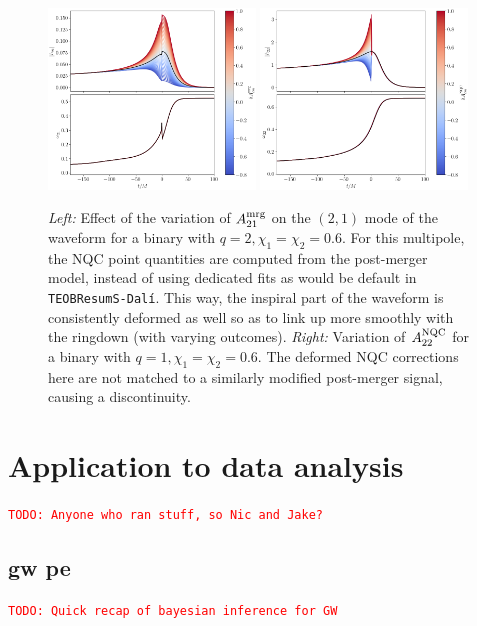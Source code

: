 \documentclass[prd,amssymb,amsmath,amsfonts,nofootinbib,reprint,showpacs,longbibliography]{revtex4-1}
\newcommand{\todo}[1]{\textcolor{red}{\texttt{TODO: #1}}}
\newcommand{\amrg}[1]{{A_{#1}^{\rm mrg}}}
\newcommand{\anqc}[1]{{A_{#1}^{\rm NQC}}}
\newcommand{\dali}[0]{\texttt{TEOBResumS-Dalí}}
\begin{document}
\begin{figure}
    \includegraphics[width=0.49\textwidth]{figs/delta_A21_mrg_-0.8_1.0.png}
    \includegraphics[width=0.49\textwidth]{figs/delta_A22_nqc_-0.8_1.0.png}
    \caption{\label{fig:bad_dev_mrgnqc}
    \textit{Left:} Effect of the variation of $\amrg{21}$ on the $(2,1)$ mode of the waveform
    for a binary with $q = 2, \chi_1 = \chi_2 = 0.6$.
    For this multipole, the NQC point quantities are computed from the post-merger model, instead of using
    dedicated fits as would be default in \dali. This way, the inspiral part of the waveform is
    consistently deformed as well so as to link up more smoothly with the ringdown (with varying outcomes).
    \textit{Right:} Variation of $\anqc{22}$ for a binary with $q = 1, \chi_1 = \chi_2 = 0.6$. The
    deformed NQC corrections here are not matched to a similarly modified post-merger signal, causing a discontinuity.}
\end{figure}

\section{Application to data analysis}
\todo{Anyone who ran stuff, so Nic and Jake? }

\subsection{\ac{gw} \ac{pe}}
\todo{Quick recap of bayesian inference for GW}
\end{document}
